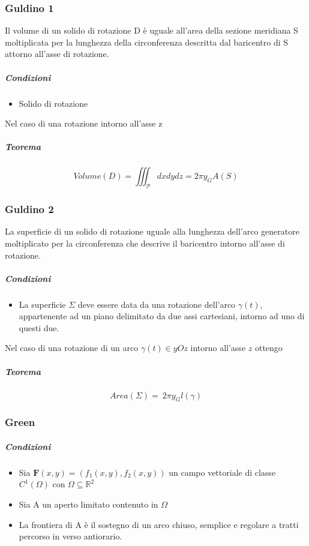\documentclass[10pt,a4paper]{report}
\begin{document}
			\subsubsection{Guldino 1}
			Il volume di un solido di rotazione D è uguale all'area della sezione meridiana S moltiplicata per la lunghezza della circonferenza descritta dal baricentro di S attorno all'asse di rotazione.
			
			\subparagraph{Condizioni}
				\begin{itemize}
					\item Solido di rotazione 	 
				\end{itemize}
			Nel caso di una rotazione intorno all'asse z	
			\subparagraph{Teorema}		
			\[ Volume(D) = \iiint_{\mathcal{P}}dxdydz = 2\pi y_{G} A(S) \]
			
			\subsubsection{Guldino 2}
			La superficie di un solido di rotazione uguale alla lunghezza dell'arco generatore moltiplicato per la circonferenza che descrive il baricentro intorno all'asse di rotazione.
			
			\subparagraph{Condizioni}
				\begin{itemize}
					\item La superficie $ \Sigma $ deve essere data da una rotazione dell'arco $ \gamma(t)  $, appartenente ad un piano delimitato da due assi cartesiani, intorno ad uno di questi due.
				\end{itemize}
			Nel caso di una rotazione di un arco $ \gamma(t) \in yOz $ intorno all'asse $ z $ ottengo	
			
			\subparagraph{Teorema}		
			\[ Area(\Sigma) = \ 2\pi y_{G} l(\gamma) \]
			
			\subsubsection{Green}
				\subparagraph{Condizioni}
					\begin{itemize}
						\item Sia $ \mathbf{F}(x,y) = (f_{1}(x,y),f_{2}(x,y)) $ un campo vettoriale di classe $C^{1} (\Omega)$ con $\Omega \subseteq \mathbb{R}^{2}$
						\item Sia A un aperto limitato contenuto in $ \Omega $
						\item La frontiera di A è il sostegno di un arco chiuso, semplice e regolare a tratti percorso in verso antiorario.
					\end{itemize}
			
\end{document}
